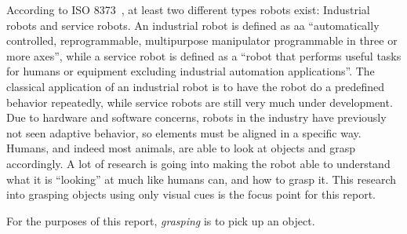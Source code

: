 According to ISO 8373~\cite{iso8373}, at least two different types robots exist:
Industrial robots and service robots.
An industrial robot is defined as aa ``automatically controlled, reprogrammable, multipurpose manipulator programmable in three or more axes'',
while a service robot is defined as a ``robot that performs useful tasks for humans or equipment excluding industrial automation applications''.
The classical application of an industrial robot is to have the robot do a predefined behavior repeatedly,
while service robots are still very much under development.
Due to hardware and software concerns, robots in the industry have previously not seen adaptive behavior,
so elements must be aligned in a specific way. Humans, and indeed most animals, are able to look at objects and grasp accordingly.
A lot of research is going into making the robot able to understand what it is ``looking'' at much like humans can,
and how to grasp it. This research into grasping objects using only visual cues is the focus point for this report.

For the purposes of this report, \emph{grasping} is to pick up an object. 
